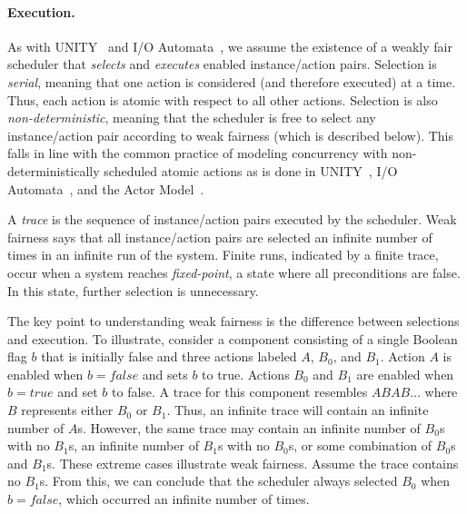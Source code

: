 \paragraph{Execution.}
As with UNITY~\cite{chandy1989parallel} and I/O Automata~\cite{nancy1996distributed}, we assume the existence of a weakly fair scheduler that \emph{selects} and \emph{executes} enabled instance/action pairs.
Selection is \emph{serial}, meaning that one action is considered (and therefore executed) at a time.
Thus, each action is atomic with respect to all other actions.
Selection is also \emph{non-deterministic}, meaning that the scheduler is free to select any instance/action pair according to weak fairness (which is described below).
This falls in line with the common practice of modeling concurrency with non-deterministically scheduled atomic actions as is done in UNITY~\cite{chandy1989parallel}, I/O Automata~\cite{nancy1996distributed}, and the Actor Model~\cite{agha1985actors}.

A \emph{trace} is the sequence of instance/action pairs executed by the scheduler.
Weak fairness says that all instance/action pairs are selected an infinite number of times in an infinite run of the system.
Finite runs, indicated by a finite trace, occur when a system reaches \emph{fixed-point}, a state where all preconditions are false.
In this state, further selection is unnecessary.

The key point to understanding weak fairness is the difference between selections and execution.
To illustrate, consider a component consisting of a single Boolean flag $b$ that is initially false and three actions labeled $A$, $B_0$, and $B_1$.
Action $A$ is enabled when $b = false$ and sets $b$ to true.
Actions $B_0$ and $B_1$ are enabled when $b = true$ and set $b$ to false.
A trace for this component resembles $ABAB \ldots$ where $B$ represents either $B_0$ or $B_1$.
Thus, an infinite trace will contain an infinite number of $A$s.
However, the same trace may contain an infinite number of $B_0$s with no $B_1$s, an infinite number of $B_1$s with no $B_0$s, or some combination of $B_0$s and $B_1$s.
These extreme cases illustrate weak fairness.
Assume the trace contains no $B_1$s.
From this, we can conclude that the scheduler always selected $B_0$ when $b = false$, which occurred an infinite number of times.

